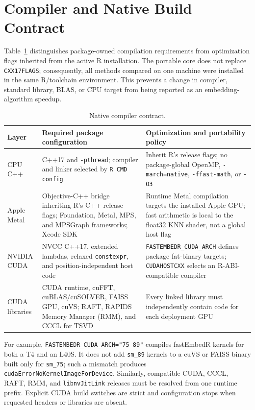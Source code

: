 \documentclass[twoside,11pt]{article}
\begin{document}
\clearpage

\section{Compiler and Native Build Contract}

Table~\ref{tab:compiler} distinguishes package-owned compilation requirements from optimization flags inherited from the active R installation. The portable core does not replace \texttt{CXX17FLAGS}; consequently, all methods compared on one machine were installed in the same R/toolchain environment. This prevents a change in compiler, standard library, BLAS, or CPU target from being reported as an embedding-algorithm speedup.

\begin{table}[ht]
\centering
\caption{Native compiler contract.}
\label{tab:compiler}
\small
\begin{tabular}{p{}p{}p{}}
\toprule
Layer & Required package configuration & Optimization and portability policy\\
\midrule
CPU C++ & C++17 and \texttt{-pthread}; compiler and linker selected by \texttt{R CMD config} & Inherit R's release flags; no package-global OpenMP, \texttt{-march=native}, \texttt{-ffast-math}, or \texttt{-O3}\\
Apple Metal & Objective-C++ bridge inheriting R's C++ release flags; Foundation, Metal, MPS, and MPSGraph frameworks; Xcode SDK & Runtime Metal compilation targets the installed Apple GPU; fast arithmetic is local to the float32 KNN shader, not a global host flag\\
NVIDIA CUDA & NVCC C++17, extended lambdas, relaxed \texttt{constexpr}, and position-independent host code & \texttt{FASTEMBEDR\_CUDA\_ARCH} defines package fat-binary targets; \texttt{CUDAHOSTCXX} selects an R-ABI-compatible compiler\\
CUDA libraries & CUDA runtime, cuFFT, cuBLAS/cuSOLVER, FAISS GPU, cuVS; RAFT, RAPIDS Memory Manager (RMM), and CCCL for TSVD & Every linked library must independently contain code for each deployment GPU\\
\bottomrule
\end{tabular}
\end{table}

For example, \texttt{FASTEMBEDR\_CUDA\_ARCH="75 89"} compiles fastEmbedR kernels for both a T4 and an L40S. It does not add \texttt{sm\_89} kernels to a cuVS or FAISS binary built only for \texttt{sm\_75}; such a mismatch produces \texttt{cudaErrorNoKernelImageForDevice}. Similarly, compatible CUDA, CCCL, RAFT, RMM, and \texttt{libnvJitLink} releases must be resolved from one runtime prefix. Explicit CUDA build switches are strict and configuration stops when requested headers or libraries are absent.
\end{document}
